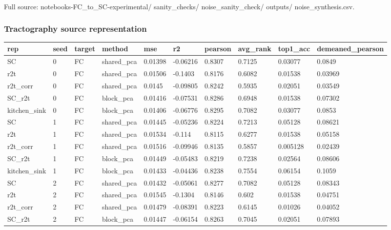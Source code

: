 Full source: notebooks-FC\_to\_SC-experimental/ sanity\_checks/ noise\_sanity\_check/ outputs/ noise\_synthesis.csv.

\subsubsection{Tractography source representation}\label{tractography-source-representation}

{\def\LTcaptype{none} %
\begin{longtable}[]{@{}llllllllll@{}}
\toprule\noalign{}
rep & seed & target & method & mse & r2 & pearson & avg\_rank & top1\_acc & demeaned\_pearson \\
\midrule\noalign{}
\endhead
\bottomrule\noalign{}
\endlastfoot
SC & 0 & FC & shared\_pca & 0.01398 & -0.06216 & 0.8307 & 0.7125 & 0.03077 & 0.0849 \\
r2t & 0 & FC & shared\_pca & 0.01506 & -0.1403 & 0.8176 & 0.6082 & 0.01538 & 0.03969 \\
r2t\_corr & 0 & FC & shared\_pca & 0.0145 & -0.09805 & 0.8242 & 0.5935 & 0.02051 & 0.03549 \\
SC\_r2t & 0 & FC & block\_pca & 0.01416 & -0.07531 & 0.8286 & 0.6948 & 0.01538 & 0.07302 \\
kitchen\_sink & 0 & FC & block\_pca & 0.01406 & -0.06776 & 0.8295 & 0.7082 & 0.03077 & 0.0853 \\
SC & 1 & FC & shared\_pca & 0.01445 & -0.05236 & 0.8224 & 0.7213 & 0.05128 & 0.08621 \\
r2t & 1 & FC & shared\_pca & 0.01534 & -0.114 & 0.8115 & 0.6277 & 0.01538 & 0.05158 \\
r2t\_corr & 1 & FC & shared\_pca & 0.01516 & -0.09946 & 0.8135 & 0.5857 & 0.005128 & 0.02439 \\
SC\_r2t & 1 & FC & block\_pca & 0.01449 & -0.05483 & 0.8219 & 0.7238 & 0.02564 & 0.08606 \\
kitchen\_sink & 1 & FC & block\_pca & 0.01433 & -0.04436 & 0.8238 & 0.7554 & 0.06154 & 0.1059 \\
SC & 2 & FC & shared\_pca & 0.01432 & -0.05061 & 0.8277 & 0.7082 & 0.05128 & 0.08343 \\
r2t & 2 & FC & shared\_pca & 0.01545 & -0.1304 & 0.8146 & 0.602 & 0.01538 & 0.04751 \\
r2t\_corr & 2 & FC & shared\_pca & 0.01479 & -0.08391 & 0.8223 & 0.6145 & 0.01026 & 0.04052 \\
SC\_r2t & 2 & FC & block\_pca & 0.01447 & -0.06154 & 0.8263 & 0.7045 & 0.02051 & 0.07893 \\
\end{longtable}
}

